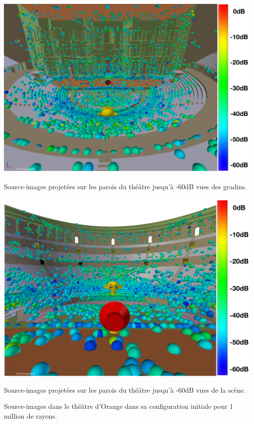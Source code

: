 \begin{figureth}
	\begin{subfigureth}{0.8\textwidth}
		\includegraphics[width=\linewidth]{images/SI60dB}
		\caption{Source-images projetées sur les parois du théâtre jusqu'à -60dB vues des gradins.}
		\label{SI60dB}
		\hfill
		\quad
	\end{subfigureth}
	
	\begin{subfigureth}{0.8\textwidth}
		\includegraphics[width=\linewidth]{images/SI60dBbis}
		\caption{Source-images projetées sur les parois du théâtre jusqu'à -60dB vues de la scène.}
		\label{SI60dBbis}
		\quad
	\end{subfigureth} 
\caption{Source-images dans le théâtre d'Orange dans sa configuration initiale pour 1 million de rayons.}	
\label{SITheatre60}
\end{figureth}
